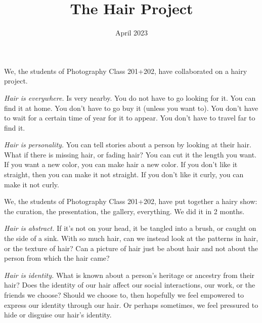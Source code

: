 \documentclass[12pt, letterpaper]{extarticle}
\begin{document}
 \title{\LARGE{The Hair Project}}
 \author{\normalsize{April 2023}}
 \date{}
  
\maketitle

\vspace{1\baselineskip}
We, the students of Photography Class 201+202, have collaborated on a hairy project.

\vspace{1\baselineskip}
\textit{Hair is everywhere.} Is very nearby. You do not have to go looking for it. You can find it at home. You don't have to go buy it (unless you want to). You don't have to wait for a certain time of year for it to appear. You don't have to travel far to find it.

\vspace{1\baselineskip}
\textit{Hair is personality.} You can tell stories about a person by looking at their hair. What if there is missing hair, or fading hair? You can cut it the length you want. If you want a new color, you can make hair a new color. If you don't like it straight, then you can make it not straight. If you don't like it curly, you can make it not curly.

\vspace{1\baselineskip}
We, the students of Photography Class 201+202, have put together a hairy show: the curation, the presentation, the gallery, everything. We did it in 2 months.

\vspace{1\baselineskip}
\textit{Hair is abstract.} If it's not on your head, it be tangled into a brush, or caught on the side of a sink. With so much hair, can we instead look at the patterns in hair, or the texture of hair? Can a picture of hair just be about hair and not about the person from which the hair came?

\vspace{1\baselineskip}
\textit{Hair is identity.} What is known about a person's heritage or ancestry from their hair? Does the identity of our hair affect our social interactions, our work, or the friends we choose? Should we choose to, then hopefully we feel empowered to express our identity through our hair. Or perhaps sometimes, we feel pressured to hide or disguise our hair's identity.





  
  
\end{document}
